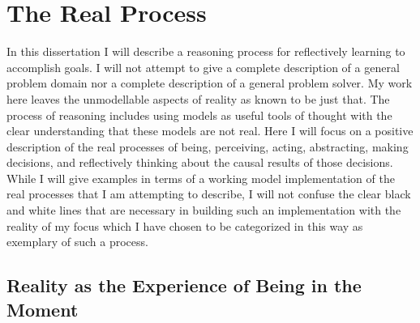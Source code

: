 \chapter{The Real Process}\label{ch:the_real_process}

In this dissertation I will describe a reasoning process for
reflectively learning to accomplish goals.  I will not attempt to give
a complete description of a general problem domain nor a complete
description of a general problem solver.  My work here leaves the
unmodellable aspects of reality as known to be just that.  The process
of reasoning includes using models as useful tools of thought with the
clear understanding that these models are not real.  Here I will focus
on a positive description of the real processes of being, perceiving,
acting, abstracting, making decisions, and reflectively thinking about
the causal results of those decisions.  While I will give examples in
terms of a working model implementation of the real processes that I
am attempting to describe, I will not confuse the clear black and
white lines that are necessary in building such an implementation with
the reality of my focus which I have chosen to be categorized in this
way as exemplary of such a process.

\section{Reality as the Experience of Being in the Moment}

